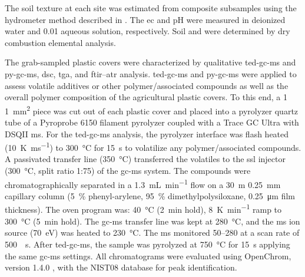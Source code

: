The soil texture at each site was estimated from composite subsamples using the hydrometer method described in \citet{ASTMD422-63Standard2007}. The \ac{ec} and pH were measured in deionized water and \SI{0.01}{\Molar}  aqueous solution, respectively. Soil  and  were determined by dry combustion elemental analysis.

The grab-sampled plastic covers were characterized by qualitative \ac{ted-gc-ms} and \ac{py-gc-ms}, \ac{dsc}, \ac{tga}, and \ac{ftir}--\ac{atr} analysis.
\ac{ted-gc-ms} and \ac{py-gc-ms} were applied to assess volatile additives or other polymer\-/associated compounds as well as the overall polymer composition of the agricultural plastic covers. To this end, a \num{1}\,\texttimes\,\SI{1}{\square\milli\meter} piece was cut out of each plastic cover and placed into a pyrolyzer quartz tube of a Pyroprobe 6150 filament pyrolyzer coupled with a Trace GC Ultra with DSQII \ac{ms}.
For the \ac{ted-gc-ms} analysis, the pyrolyzer interface was flash heated (\SI{10}{\kelvin\per\milli\second}) to \SI{300}{\degreeCelsius} for \SI{15}{\second} to volatilize any polymer\-/associated compounds. A passivated transfer line (\SI{350}{\degreeCelsius}) transferred the volatiles to the \ac{ssl} injector (\SI{300}{\degreeCelsius}, split ratio 1:75) of the \ac{gc-ms} system.
The compounds were chromatographically separated in a \SI{1.3}{\milli\liter\per\minute}  flow on a \SI{30}{\meter}\,\texttimes\,\SI{0.25}{\milli\meter} capillary column (\SI{5}{\percent} phenyl-arylene, \SI{95}{\percent} dimethylpolysiloxane, \SI{0.25}{\micro\meter} film thickness). The oven program was: \SI{40}{\degreeCelsius} (\SI{2}{\minute} hold), \SI{8}{\kelvin\per\minute} ramp to \SI{300}{\degreeCelsius} (\SI{5}{\minute} hold). The \ac{gc-ms} transfer line was kept at \SI{280}{\degreeCelsius}, and the \ac{ms} ion source (\SI{70}{\electronvolt}) was heated to \SI{230}{\degreeCelsius}. The \ac{ms} monitored \SIrange{50}{280}{\mz} at a scan rate of \SI{500}{\per\second}.
After \ac{ted-gc-ms}, the sample was pyrolyzed at \SI{750}{\degreeCelsius} for \SI{15}{\second} applying the same \ac{gc-ms} settings. All chromatograms were evaluated using OpenChrom, version 1.4.0 \citep{WenigOpenChrom2010}, with the NIST08 database for peak identification.

